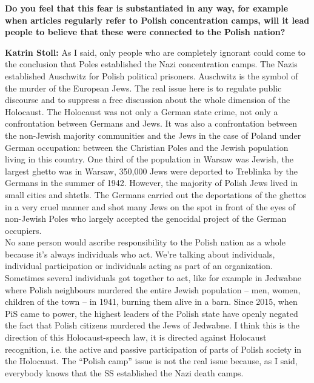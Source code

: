 \textbf{Do you feel that this fear is substantiated in any way, for example when articles regularly refer to Polish concentration camps, will it lead people to believe that these were connected to the Polish nation?}

\textbf{Katrin Stoll:} As I said, only people who are completely ignorant could come to the conclusion that Poles established the Nazi concentration camps. The Nazis established Auschwitz for Polish political prisoners. Auschwitz is the symbol of the murder of the European Jews. The real issue here is to regulate public discourse and to suppress a free discussion about the whole dimension of the Holocaust. The Holocaust was not only a German state crime, not only a confrontation between Germans and Jews. It was also a confrontation between the non-Jewish majority communities and the Jews in the case of Poland under German occupation: between the Christian Poles and the Jewish population living in this country. One third of the population in Warsaw was Jewish, the largest ghetto was in Warsaw, 350,000 Jews were deported to Treblinka by the Germans in the summer of 1942. However, the majority of Polish Jews lived in small cities and shtetls. The Germans carried out the deportations of the ghettos in a very cruel manner and shot many Jews on the spot in front of the eyes of non-Jewish Poles who largely accepted the genocidal project of the German occupiers.\\ 
No sane person would ascribe responsibility to the Polish nation as a whole because it’s always individuals who act. We’re talking about individuals, individual participation or individuals acting as part of an organization. Sometimes several individuals got together to act, like for example in Jedwabne where Polish neighbours murdered the entire Jewish population – men, women, children of the town – in 1941, burning them alive in a barn. Since 2015, when PiS came to power, the highest leaders of the Polish state have openly negated the fact that Polish citizens murdered the Jews of Jedwabne. I think this is the direction of this Holocaust-speech law, it is directed against Holocaust recognition, i.e. the active and passive participation of parts of Polish society in the Holocaust. The ``Polish camp'' issue is not the real issue because, as I said, everybody knows that the SS established the Nazi death camps. 

